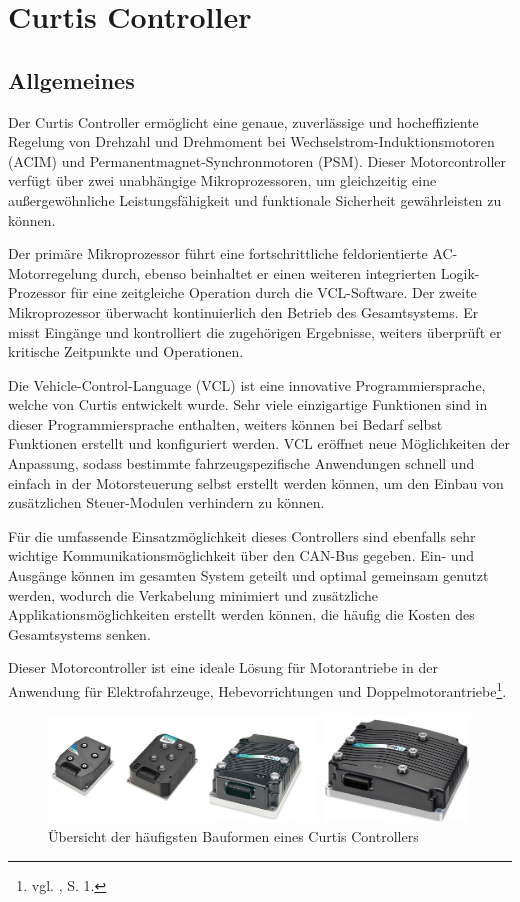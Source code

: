 \newpage

\section{Curtis Controller}
\subsection{Allgemeines}
Der Curtis Controller ermöglicht eine genaue, zuverlässige und hocheffiziente Regelung von Drehzahl und Drehmoment bei Wechselstrom-Induktionsmotoren (ACIM) und Permanentmagnet-Synchronmotoren (PSM). Dieser Motorcontroller verfügt über zwei unabhängige Mikroprozessoren, um gleichzeitig eine außergewöhnliche Leistungsfähigkeit und funktionale Sicherheit gewährleisten zu können. 

Der primäre Mikroprozessor führt eine fortschrittliche feldorientierte AC-Motorregelung durch, ebenso beinhaltet er einen weiteren integrierten Logik-Prozessor für eine zeitgleiche Operation durch die VCL-Software. Der zweite Mikroprozessor überwacht kontinuierlich den Betrieb des Gesamtsystems. Er misst Eingänge und kontrolliert die zugehörigen Ergebnisse, weiters überprüft er kritische Zeitpunkte und Operationen. 

Die Vehicle-Control-Language (VCL) ist eine  innovative Programmiersprache, welche von Curtis entwickelt wurde. Sehr viele einzigartige Funktionen sind in dieser Programmiersprache enthalten, weiters können bei Bedarf selbst Funktionen erstellt und konfiguriert werden. VCL eröffnet neue Möglichkeiten der Anpassung, sodass bestimmte fahrzeugspezifische Anwendungen schnell und einfach in der Motorsteuerung selbst erstellt werden können, um den Einbau von zusätzlichen Steuer-Modulen verhindern zu können.

Für die umfassende Einsatzmöglichkeit dieses Controllers sind ebenfalls sehr wichtige Kommunikationsmöglichkeit über den CAN-Bus gegeben. Ein- und Ausgänge können im gesamten System geteilt und optimal gemeinsam genutzt werden, wodurch die Verkabelung minimiert und zusätzliche Applikationsmöglichkeiten erstellt werden können, die häufig die Kosten des Gesamtsystems senken.

Dieser Motorcontroller ist eine ideale Lösung für Motorantriebe in der Anwendung für Elektrofahrzeuge, Hebevorrichtungen und Doppelmotorantriebe\footnote{vgl. \cite{Manual}, S. 1.}.
\\[10mm]
\begin{figure}[H]
	\begin{center}
		\includegraphics[width=\textwidth]{figures/antrieb/Curtis_Bauformen.png}
		\caption{Übersicht der häufigsten Bauformen eines Curtis Controllers \cite{Manual}}
	\end{center}
\end{figure}



